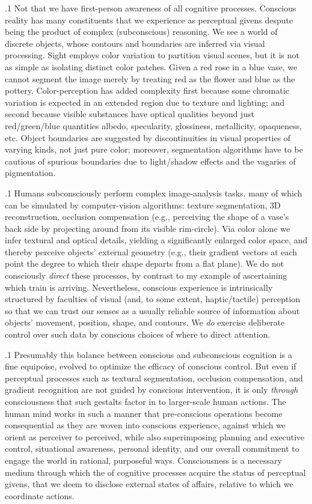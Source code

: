 \documentclass[11pt, twocolumn]{article}
\begin{document}
\p.1{%
Not that we have first-person awareness of all cognitive
processes.  Conscious reality has many constituents
that we experience as perceptual givens despute being the product of
complex (subconscious) reasoning.  We see a world of discrete objects,
whose contours and boundaries are inferred via visual processing.
Sight employs color variation to partition visual scenes, but
it is not as simple as isolating distinct color patches.  Given a
red rose in a blue vase, we cannot segment the image merely by
treating red as the flower and blue as the pottery.
Color-perception has added complexity first because some chromatic
variation is expected in an extended region due to texture
and lighting; and second because visible substances have
optical qualities beyond just red/green/blue quantities
\mdash{} albedo, specularity, glossiness, metallicity, opaqueness, etc.
Object boundaries are suggested by discontinuities in visual properties of
varying kinds, not just pure color; moreover, segmentation
algorithms have to be cautious of spurious boundaries
due to light/shadow effects and the vagaries of pigmentation.
} %

\p.1{%
Humans subconsciously perform complex image-analysis tasks, many
of which can be simulated by computer-vision algorithms:
texture segmentation, 3D reconstruction, occlusion compensation
(e.g., perceiving the shape of a vase's back side by projecting
around from its visible rim-circle).  Via color alone we
infer textural and optical details, yielding a significantly
enlarged color space, and thereby perceive objects' external
geometry (e.g., their gradient vectors at each point
\mdash{} the degree to which their shape departs from a flat plane).
We do not consciously \textit{direct} these processes, by contrast to
my example of ascertaining which train is arriving.  Nevertheless,
conscious experience is intrinsically structured by
faculties of visual (and, to some extent, haptic/tactile)
perception so that we can trust our senses as a usually
reliable source of information about objects' movement,
position, shape, and contours.  We \textit{do} exercise deliberate
control over such data by conscious choices of where to
direct attention.
} %

\p.1{%
Presumably this balance between conscious and subconscious
cognition is a fine equipoise, evolved to optimize the
efficacy of conscious control.  But even if perceptual
processes such as textural segmentation, occlusion compensation,
and gradient recognition are not guided by conscious
intervention, it is only \textit{through} consciousness
that such gestalts factor in to larger-scale
human actions.  The human mind works in such a manner
that pre-conscious operations become consequential
as they are woven into conscious experience,
against which we orient as perceiver to perceived,
while also superimposing planning and executive
control, situational awareness, personal identity,
and our overall commitment to engage the world
in rational, purposeful ways.  Consciousness
is a necessary medium through which the
 of cognitive processes acquire the status
of perceptual givens, that we deem to disclose
external states of affairs, relative to which we coordinate actions.
} %
\end{document}
